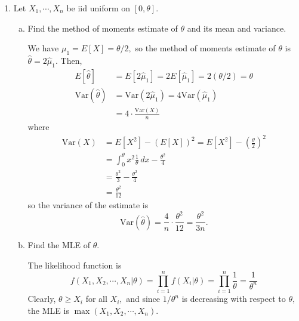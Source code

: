 \documentclass{article}
\newcommand{\var}{\mathrm{Var}}
\newcommand{\cov}{\mathrm{Cov}}
\begin{document}
\begin{enumerate}
\begin{enumerate}[(a)]
\begin{proof}
				\end{proof}<++>

			\item Compute the variance of $Z.$ 

			\item Show that $\cov(Z, T)=1.$ 
				
		\end{enumerate}

	\item Let $X_1, \cdots, X_n$ be iid uniform on $[0, \theta].$

		\begin{enumerate}[a.]
			\item Find the method of moments estimate of $\theta$ and its mean and variance.
				\begin{soln}
					We have $\mu_1=E[X]=\theta/2,$ so the method of moments estimate of $\theta$ is $\hat{\theta}=2\hat{\mu}_1.$ Then,
					\begin{align*}
						E[\hat{\theta}] &= E[2\hat{\mu}_1]=2E[\hat{\mu}_1]=2(\theta/2)=\theta \\
						\var(\hat{\theta}) &= \var(2\hat{\mu}_1) = 4\var(\hat{\mu}_1) \\
						&= 4\cdot\frac{\var(X)}{n} 
					\end{align*} where 
					\begin{align*}
						\var(X) &= E[X^2]-(E[X])^2 = E[X^2] - \left( \frac{\theta}{2} \right)^2 \\
						&= \int_0^\theta x^2\frac{1}{\theta}\, dx - \frac{\theta^2}{4} \\
						&= \frac{\theta^2}{3}-\frac{\theta^2}{4} \\
						&= \frac{\theta^2}{12}
					\end{align*} so the variance of the estimate is \[\var(\hat{\theta}) = \frac{4}{n}\cdot\frac{\theta^2}{12}= \frac{\theta^2}{3n}.\]
					
				\end{soln}

			\item Find the MLE of $\theta.$
				\begin{soln}
					The likelihood function is \[f(X_1, X_2, \cdots, X_n|\theta)=\prod_{i=1}^n f(X_i|\theta)=\prod_{i=1}^n \frac{1}{\theta}=\frac{1}{\theta^n}\] Clearly, $\theta\ge X_i$ for all $X_i,$ and since $1/\theta^n$ is decreasing with respect to $\theta,$ the MLE is $\max{(X_1, X_2, \cdots, X_n)}.$
					
				\end{soln}


\end{enumerate}
\end{enumerate}
\end{document}
